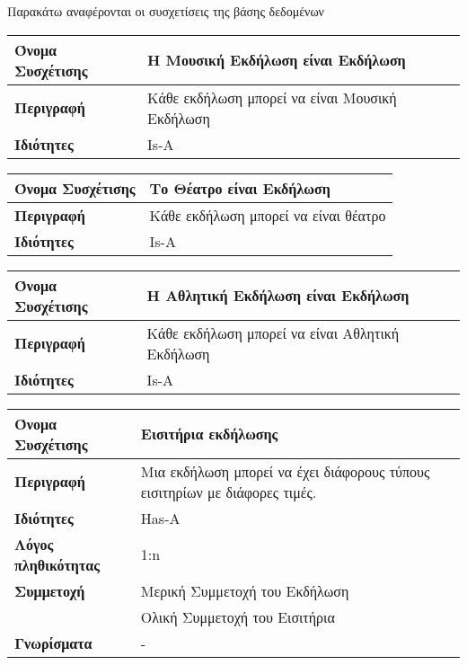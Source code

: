 Παρακάτω αναφέρονται οι συσχετίσεις της βάσης δεδομένων \titlos
\begin{center}
\begin{tabular}[]{|p{4cm}|p{10cm}|}
  \hline
  \textbf{Όνομα Συσχέτισης} & Η Μουσική Εκδήλωση είναι Εκδήλωση\\ \hline
  \textbf{Περιγραφή} & Κάθε εκδήλωση μπορεί να είναι Μουσική Εκδήλωση\\ \hline
  \textbf{Ιδιότητες} & Is-A  \\ \hline
\end{tabular}
\vspace{0.3 cm}

\begin{tabular}[]{|p{4cm}|p{10cm}|}
  \hline
  \textbf{Όνομα Συσχέτισης} & Το Θέατρο είναι Εκδήλωση\\ \hline
  \textbf{Περιγραφή} & Κάθε εκδήλωση μπορεί να είναι θέατρο\\ \hline
  \textbf{Ιδιότητες} & Is-A  \\ \hline
\end{tabular}
\vspace{0.3 cm}

\begin{tabular}[]{|p{4cm}|p{10cm}|}
  \hline
  \textbf{Όνομα Συσχέτισης} & Η Αθλητική Εκδήλωση είναι Εκδήλωση\\ \hline
  \textbf{Περιγραφή} & Κάθε εκδήλωση μπορεί να είναι Αθλητική Εκδήλωση\\ \hline
  \textbf{Ιδιότητες} & Is-A  \\ \hline
\end{tabular}
\vspace{0.3 cm}


\begin{tabular}[]{|p{4cm}|p{10cm}|}
  \hline
  \textbf{Όνομα Συσχέτισης}   & Εισιτήρια εκδήλωσης            \\ \hline
  \textbf{Περιγραφή}          & Μια εκδήλωση μπορεί να έχει διάφορους τύπους
                             εισιτηρίων με διάφορες τιμές.     \\ \hline
  \textbf{Ιδιότητες}          & Has-A                          \\ \hline
  \textbf{Λόγος πληθικότητας} & 1:n                            \\ \hline
  \textbf{Συμμετοχή}          & Μερική Συμμετοχή του Εκδήλωση  \\ \cline{2-2}
                              & Ολική Συμμετοχή του Εισιτήρια \\ \hline
  \textbf{Γνωρίσματα}         & -                              \\ \hline
\end{tabular}
\vspace{0.3 cm}


\end{center}
